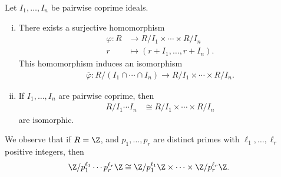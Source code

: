 \documentclass[10pt]{mypackage}
\begin{document}
\begin{theorem}
  Let $I_1,\dots,I_n$ be pairwise coprime ideals.
  \begin{enumerate}[(i)]
    \item There exists a surjective homomorphism 
      \begin{align*}
        \varphi\colon R&\rightarrow  R/I_1\times\cdots\times R/I_n\\
        r &\mapsto \left( r + I_1,\dots, r + I_n \right).
      \end{align*}
      This homomorphism induces an isomorphism
      \begin{align*}
        \overline{\varphi}\colon R/\left( I_1\cap\cdots\cap I_n \right) \rightarrow R/I_1\times\cdots\times R/I_n.
      \end{align*}
    \item If $I_1,\dots,I_n$ are pairwise coprime, then
      \begin{align*}
        R/I_1\cdots I_n &\cong R/I_1\times\cdots\times R/I_n
      \end{align*}
      are isomorphic.
  \end{enumerate}
\end{theorem}
\begin{example}
  We observe that if $R = \Z$, and $p_1,\dots,p_r$ are distinct primes with $\ell_1,\dots,\ell_r$ positive integers, then
  \begin{align*}
    \Z/p_1^{\ell_1}\cdots p_{r}^{\ell_r}\Z &\cong \Z/p_{1}^{\ell_1}\Z \times\cdots\times \Z/p_{r}^{\ell_r}\Z.
  \end{align*}
\end{example}
\end{document}
